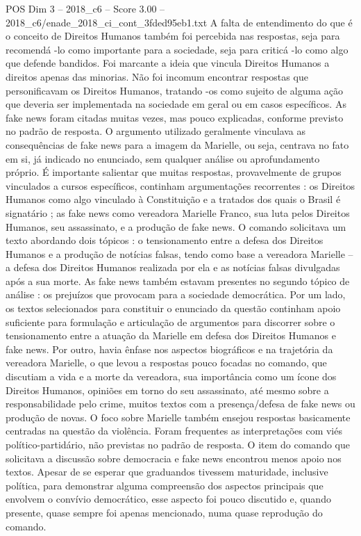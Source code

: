 \begin{textsample}{POS Dim 3 – 2018\_c6 – Score 3.00 – 2018\_c6/enade\_2018\_ci\_cont\_3fded95eb1.txt}
A falta de entendimento do que é o conceito de Direitos Humanos também foi percebida nas respostas, seja para recomendá -lo como importante para a sociedade, seja para criticá -lo como algo que defende bandidos.
Foi marcante a ideia que vincula Direitos Humanos a direitos apenas das minorias.
Não foi incomum encontrar respostas que personificavam os Direitos Humanos, tratando -os como sujeito de alguma ação que deveria ser implementada na sociedade em geral ou em casos específicos.
As fake news foram citadas muitas vezes, mas pouco explicadas, conforme previsto no padrão de resposta.
O argumento utilizado geralmente vinculava as consequências de fake news para a imagem da Marielle, ou seja, centrava no fato em si, já indicado no enunciado, sem qualquer análise ou aprofundamento próprio.
É importante salientar que muitas respostas, provavelmente de grupos vinculados a cursos específicos, continham argumentações recorrentes : os Direitos Humanos como algo vinculado à Constituição e a tratados dos quais o Brasil é signatário ; as fake news como vereadora Marielle Franco, sua luta pelos Direitos Humanos, seu assassinato, e a produção de fake news.
O comando solicitava um texto abordando dois tópicos : o tensionamento entre a defesa dos Direitos Humanos e a produção de notícias falsas, tendo como base a vereadora Marielle – a defesa dos Direitos Humanos realizada por ela e as notícias falsas divulgadas após a sua morte.
As fake news também estavam presentes no segundo tópico de análise : os prejuízos que provocam para a sociedade democrática.
Por um lado, os textos selecionados para constituir o enunciado da questão continham apoio suficiente para formulação e articulação de argumentos para discorrer sobre o tensionamento entre a atuação da Marielle em defesa dos Direitos Humanos e fake news.
Por outro, havia ênfase nos aspectos biográficos e na trajetória da vereadora Marielle, o que levou a respostas pouco focadas no comando, que discutiam a vida e a morte da vereadora, sua importância como um ícone dos Direitos Humanos, opiniões em torno do seu assassinato, até mesmo sobre a responsabilidade pelo crime, muitos textos com a presença/defesa de fake news ou produção de novas.
O foco sobre Marielle também ensejou respostas basicamente centradas na questão da violência.
Foram frequentes as interpretações com viés político-partidário, não previstas no padrão de resposta.
O item do comando que solicitava a discussão sobre democracia e fake news encontrou menos apoio nos textos.
Apesar de se esperar que graduandos tivessem maturidade, inclusive política, para demonstrar alguma compreensão dos aspectos principais que envolvem o convívio democrático, esse aspecto foi pouco discutido e, quando presente, quase sempre foi apenas mencionado, numa quase reprodução do comando.

\end{textsample}
